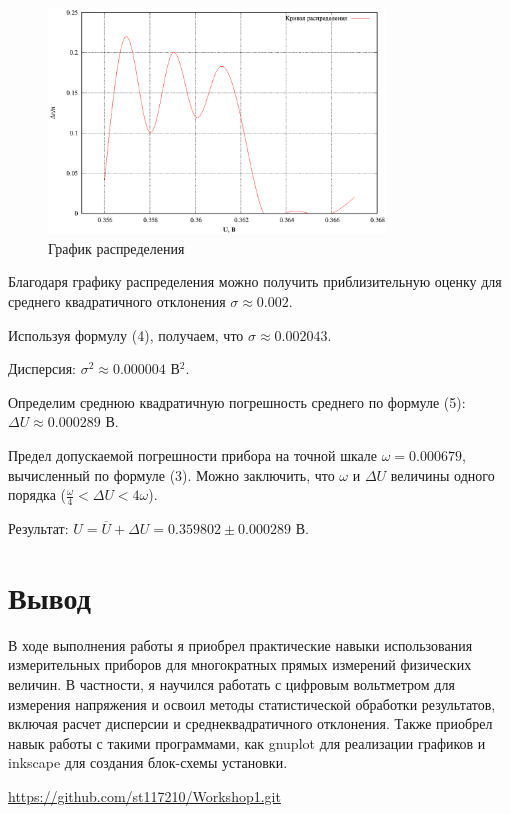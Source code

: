 \begin{figure}[ht!]
\centering
\includegraphics[width=0.8\textwidth]{delta_n_vs_voltage.eps}
\caption{График распределения}
\label{fig:plot3}
\end{figure}

Благодаря графику распределения можно получить приблизительную оценку для среднего квадратичного отклонения $\sigma \approx 0.002$. 

Используя формулу (4), получаем, что $\sigma \approx 0.002043$.

Дисперсия: $\sigma^2 \approx 0.000004$ В$^2$.

Определим среднюю квадратичную погрешность среднего по формуле (5): $\Delta U \approx 0.000289$ В.


Предел допускаемой погрешности прибора на точной шкале $\omega = 0.000679$, вычисленный по формуле (3). Можно  заключить, что $\omega$ и $\Delta U$ величины одного порядка ($\frac{\omega}{4} < \Delta U < 4\omega$).

Результат: $U = \overline{U}  + \Delta U= 0.359802 \pm 0.000289$ В.
\clearpage
\section{Вывод}
В ходе выполнения работы я приобрел практические навыки использования измерительных приборов для многократных прямых измерений физических величин. В частности, я научился работать с цифровым вольтметром для измерения напряжения и освоил методы статистической обработки результатов, включая расчет дисперсии и среднеквадратичного отклонения. Также приобрел навык работы с такими программами, как gnuplot для реализации графиков и inkscape для создания блок-схемы установки. 
\begin{thebibliography}{9}

\url{https://github.com/st117210/Workshop1.git}  

\end{thebibliography}
\clearpage
\appendix